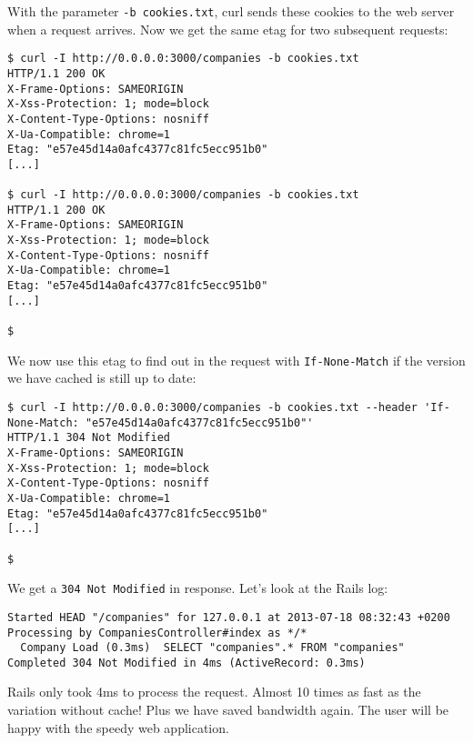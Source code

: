 \documentclass[a4paper]{book}
\begin{document}
With the parameter \texttt{-b cookies.txt}, curl sends these cookies to the web server when a request arrives. Now we get the same etag for two subsequent requests:

\begin{shaded}\begin{verbatim}
$ curl -I http://0.0.0.0:3000/companies -b cookies.txt
HTTP/1.1 200 OK
X-Frame-Options: SAMEORIGIN
X-Xss-Protection: 1; mode=block
X-Content-Type-Options: nosniff
X-Ua-Compatible: chrome=1
Etag: "e57e45d14a0afc4377c81fc5ecc951b0"
[...]

$ curl -I http://0.0.0.0:3000/companies -b cookies.txt
HTTP/1.1 200 OK
X-Frame-Options: SAMEORIGIN
X-Xss-Protection: 1; mode=block
X-Content-Type-Options: nosniff
X-Ua-Compatible: chrome=1
Etag: "e57e45d14a0afc4377c81fc5ecc951b0"
[...]

$
\end{verbatim}\end{shaded}

We now use this etag to find out in the request with \texttt{If-None-Match} if the version we have cached is still up to date:

\begin{shaded}\begin{verbatim}
$ curl -I http://0.0.0.0:3000/companies -b cookies.txt --header 'If-None-Match: "e57e45d14a0afc4377c81fc5ecc951b0"'
HTTP/1.1 304 Not Modified
X-Frame-Options: SAMEORIGIN
X-Xss-Protection: 1; mode=block
X-Content-Type-Options: nosniff
X-Ua-Compatible: chrome=1
Etag: "e57e45d14a0afc4377c81fc5ecc951b0"
[...]

$
\end{verbatim}\end{shaded}

We get a \texttt{304 Not Modified} in response. Let's look at the Rails log:

\begin{shaded}\begin{verbatim}
Started HEAD "/companies" for 127.0.0.1 at 2013-07-18 08:32:43 +0200
Processing by CompaniesController#index as */*
  Company Load (0.3ms)  SELECT "companies".* FROM "companies"
Completed 304 Not Modified in 4ms (ActiveRecord: 0.3ms)
\end{verbatim}\end{shaded}

Rails only took 4ms to process the request. Almost 10 times as fast as the variation without cache! Plus we have saved bandwidth again. The user will be happy with the speedy web application.
\end{document}
